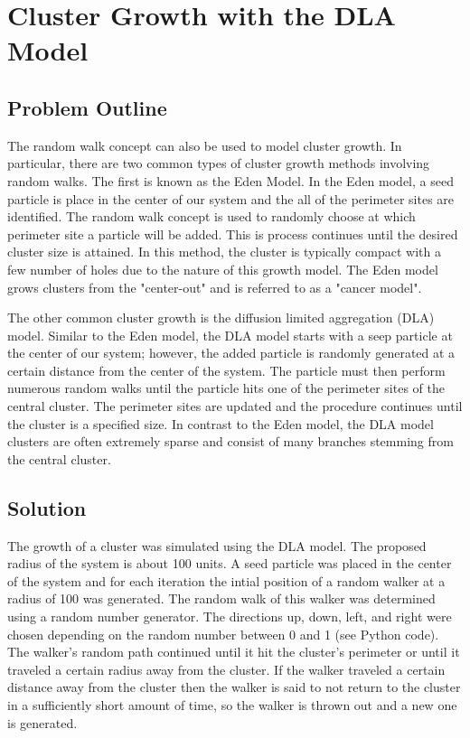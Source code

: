 \documentclass[a4paper,12pt]{article}
\begin{document}
\section{Cluster Growth with the DLA Model}
\subsection{Problem Outline}
\indent
\indent The random walk concept can also be used to model cluster growth.  In particular, there are two common types of cluster growth methods involving random walks.
The first is known as the Eden Model.  In the Eden model, a seed particle is place in the center of our system and the all of the perimeter sites are identified.  The 
random walk concept is used to randomly choose at which perimeter site a particle will be added.  This is process continues until the desired cluster size is attained.
In this method, the cluster is typically compact with a few number of holes due to the nature of this growth model.  The Eden model grows clusters from the "center-out" 
and is referred to as a "cancer model". 

\indent The other common cluster growth is the diffusion limited aggregation (DLA) model.  Similar to the Eden model, the DLA model starts with a seep particle at 
the center of our system; however, the added particle is randomly generated at a certain distance from the center of the system.  The particle must then perform 
numerous random walks until the particle hits one of the perimeter sites of the central cluster.  The perimeter sites are updated and the procedure continues until
the cluster is a specified size.  In contrast to the Eden model, the DLA model clusters are often extremely sparse and consist of many branches stemming from the 
central cluster.

\subsection{Solution}
\indent
\indent The growth of a cluster was simulated using the DLA model.  The proposed radius of the system is about 100 units.  A seed particle was placed in the center of 
the system and for each iteration the intial position of a random walker at a radius of 100 was generated.  The random walk of this walker was determined using a 
random number generator.  The directions up, down, left, and right were chosen depending on the random number between 0 and 1 (see Python code). The walker's random path
continued until it hit the cluster's perimeter or until it traveled a certain radius away from the cluster.  If the walker traveled a certain distance away from the 
cluster then the walker is said to not return to the cluster in a sufficiently short amount of time, so the walker is thrown out and a new one is generated.
\end{document}

